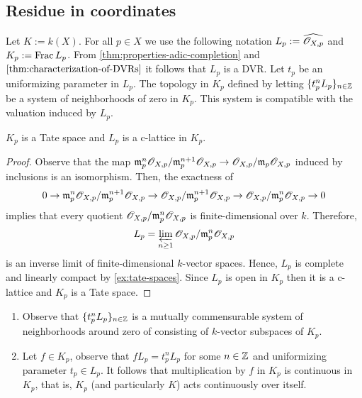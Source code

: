 \subsection{Residue in coordinates}
Let $K := k(X)$. For all $p \in X$ we use the following notation $L_{p} := \widehat{{\mathscr O}_{X,p}}$ and $K_{p}:=\operatorname{Frac} L_{p}$. From \cref{thm:properties-adic-completion} and $\cref{thm:characterization-of-DVRs}$ it follows that $L_{p}$ is a DVR. Let $t_{p}$ be an uniformizing parameter in $L_{p}$. The topology in $K_{p}$ defined by letting $\{t_{p}^{n}L_{p}\}_{n\in {\mathbb Z}}$ be a system of neighborhoods of zero in $K_{p}$. This system is compatible with the valuation induced by $L_{p}$.
\begin{proposition}\label{prop:complete-fraction-field-is-a-Tate-space}
	$K_{p}$ is a Tate space and $L_{p}$ is a c-lattice in $K_{p}$.
\end{proposition}
\begin{proof}
	Observe that the map $\mathfrak{m}_{p}^{n}{\mathscr O}_{X,p}/\mathfrak{m}_{p}^{n+1}{\mathscr O}_{X,p} \to {\mathscr O}_{X,p}/\mathfrak{m}_{p}{\mathscr O}_{X,p}$ induced by inclusions is an isomorphism. Then, the exactness of
	\[
		0 \to \mathfrak{m}_{p}^{n}{\mathscr O}_{X,p}/\mathfrak{m}_{p}^{n+1}{\mathscr O}_{X,p} \to {\mathscr O}_{X,p}/\mathfrak{m}_{p}^{n+1}{\mathscr O}_{X,p} \to {\mathscr O}_{X,p}/\mathfrak{m}_{p}^{n}{\mathscr O}_{X,p} \to 0
	\]
	implies that every quotient ${\mathscr O}_{X,p}/\mathfrak{m}_{p}^{n}{\mathscr O}_{X,p}$ is finite-dimensional over $k$. Therefore, 
	\[
		L_{p} = \varprojlim_{n\geq 1} {\mathscr O}_{X,p}/\mathfrak{m}_{p}^{n}{\mathscr O}_{X,p}
	\]
	is an inverse limit of finite-dimensional $k$-vector spaces. Hence, $L_{p}$ is complete and linearly compact by \cref{ex:tate-spaces}. Since $L_{p}$ is open in $K_{p}$ then it is a c-lattice and $K_{p}$ is a Tate space.
\end{proof}
\begin{remark}\label{rem:mutually-commensurable-system}
\begin{enumerate}[label = (\alph*)]
	\item Observe that $\{t_{p}^{n}L_{p}\}_{n\in {\mathbb Z}}$ is a mutually commensurable system of neighborhoods around zero of consisting of $k$-vector subspaces of $K_{p}$. 
	\item Let $f\in K_{p}$, observe that $fL_{p} = t_{p}^{n}L_{p}$ for some $n \in {\mathbb Z}$ and uniformizing parameter $t_{p} \in L_{p}$. It follows that multiplication by $f$ in $K_{p}$ is continuous in $K_{p}$, that is, $K_{p}$ (and particularly $K$) acts continuously over itself.
\end{enumerate}
\end{remark}

